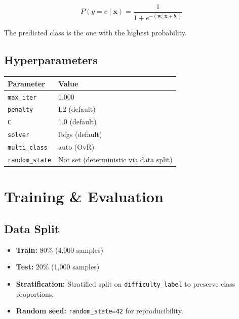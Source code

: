 \documentclass[12pt, a4paper, twoside]{article}
\newcommand{\code}[1]{\texttt{#1}}
\begin{document}
\begin{equation}\label{eq:logistic}
    P(y = c \mid \mathbf{x}) =
    \frac{1}{1 + e^{-(\mathbf{w}_c^\top \mathbf{x} + b_c)}}
\end{equation}

\noindent The predicted class is the one with the highest probability.

\subsection{Hyperparameters}

\begin{center}
\renewcommand{\arraystretch}{1.2}
\begin{tabular}{ll}
    \toprule
    \textbf{Parameter} & \textbf{Value} \\
    \midrule
    \code{max\_iter}       & 1{,}000 \\
    \code{penalty}         & L2 (default) \\
    \code{C}               & 1.0 (default) \\
    \code{solver}          & lbfgs (default) \\
    \code{multi\_class}    & auto (OvR) \\
    \code{random\_state}   & Not set (deterministic via data split) \\
    \bottomrule
\end{tabular}
\end{center}

\section{Training \& Evaluation}\label{sec:training}

\subsection{Data Split}

\begin{itemize}[leftmargin=2em]
    \item \textbf{Train:} 80\% (4{,}000 samples)
    \item \textbf{Test:} 20\% (1{,}000 samples)
    \item \textbf{Stratification:} Stratified split on
          \code{difficulty\_label} to preserve class proportions.
    \item \textbf{Random seed:} \code{random\_state=42} for
          reproducibility.
\end{itemize}
\end{document}
